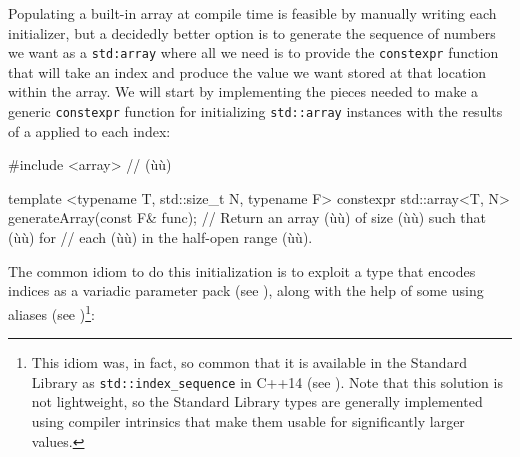 Populating a built-in array at compile time is feasible by manually
writing each initializer, but a decidedly better option is to generate
the sequence of numbers we want as a \lstinline!std:array! where all we
need is to provide the \lstinline!constexpr! function that will take an
index and produce the value we want stored at that location within the
array. We will start by implementing the pieces needed to make a generic
\lstinline!constexpr! function for initializing \lstinline!std::array!
instances with the results of a  applied to each
index:

\begin{emcppslisting}[emcppsbatch=e14]
#include <array>  // (ù{}ù)

template <typename T, std::size_t N, typename F>
constexpr std::array<T, N> generateArray(const F& func);
    // Return an array (ù{}ù) of size (ù{}ù) such that (ù{}ù) for
    // each (ù{}ù) in the half-open range (ù{\codeincomments{[0, N)}}ù).
\end{emcppslisting}


\noindent The common idiom to do this initialization is to exploit a type that
encodes indices as a variadic parameter pack (see ), along with the help of some using aliases (see
){\cprotect\footnote{This idiom
  was, in fact, so common that it is available in the Standard Library
  as \lstinline!std::index_sequence! in C++14 (see
  \cite{wakely13}). Note that this solution is not lightweight,
  so the Standard Library types are generally implemented using compiler
  intrinsics that make them usable for significantly larger values.}}:


